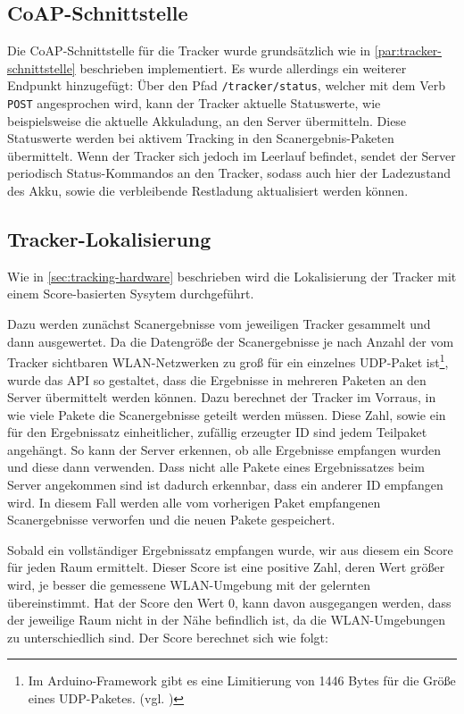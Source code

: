 \subsection{CoAP-Schnittstelle}

Die \gls{CoAP}-Schnittstelle für die Tracker wurde grundsätzlich wie in
\autoref{par:tracker-schnittstelle} beschrieben implementiert. Es wurde allerdings ein weiterer
Endpunkt hinzugefügt: Über den Pfad \texttt{/tracker/status}, welcher mit dem Verb \texttt{POST}
angesprochen wird, kann der Tracker aktuelle Statuswerte, wie beispielsweise die aktuelle
Akkuladung, an den Server übermitteln. Diese Statuswerte werden bei aktivem Tracking in den
Scanergebnis-Paketen übermittelt. Wenn der Tracker sich jedoch im Leerlauf befindet, sendet der
Server periodisch Status-Kommandos an den Tracker, sodass auch hier der Ladezustand des \gls{Akku}, sowie
die verbleibende Restladung aktualisiert werden können.

\subsection{Tracker-Lokalisierung}

Wie in \autoref{sec:tracking-hardware} beschrieben wird die Lokalisierung der Tracker mit einem
Score-basierten Sysytem durchgeführt.

Dazu werden zunächst Scanergebnisse vom jeweiligen Tracker gesammelt und dann ausgewertet. Da die
Datengröße der Scanergebnisse je nach Anzahl der vom Tracker sichtbaren \gls{WLAN}-Netzwerken zu
groß für ein einzelnes \gls{UDP}-Paket ist\footnote{Im Arduino-Framework gibt es eine
Limitierung von 1446 Bytes für die Größe eines \gls{UDP}-Paketes. (vgl. \cite{Arduino2020})}, wurde
das \gls{API} so gestaltet, dass die Ergebnisse in mehreren Paketen an den Server übermittelt werden
können. Dazu berechnet der Tracker im Vorraus, in wie viele Pakete die Scanergebnisse geteilt werden
müssen. Diese Zahl, sowie ein für den Ergebnissatz einheitlicher, zufällig erzeugter \gls{ID} sind
jedem Teilpaket angehängt. So kann der Server erkennen, ob alle Ergebnisse empfangen wurden und
diese dann verwenden. Dass nicht alle Pakete eines Ergebnissatzes beim Server angekommen sind ist
dadurch erkennbar, dass ein anderer \gls{ID} empfangen wird. In diesem Fall werden alle vom
vorherigen Paket empfangenen Scanergebnisse verworfen und die neuen Pakete gespeichert.

Sobald ein vollständiger Ergebnissatz empfangen wurde, wir aus diesem ein Score für jeden Raum
ermittelt. Dieser Score ist eine positive Zahl, deren Wert größer wird, je besser die gemessene
\gls{WLAN}-Umgebung mit der gelernten übereinstimmt. Hat der Score den Wert $0$, kann davon
ausgegangen werden, dass der jeweilige Raum nicht in der Nähe befindlich ist, da die
\gls{WLAN}-Umgebungen zu unterschiedlich sind. Der Score berechnet sich wie folgt:

